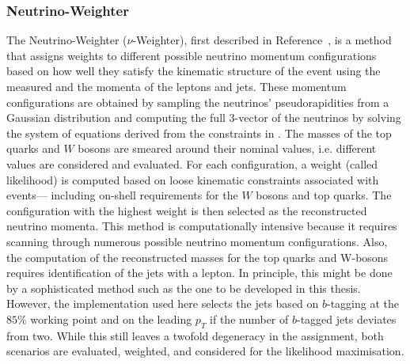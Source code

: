 \subsubsection{Neutrino-Weighter}
\label{sec:nu_weighter}
The Neutrino-Weighter ($\nu$-Weighter), first described in Reference~\cite{neutrino_weighting_method}, is a method that assigns weights to different possible neutrino momentum configurations based on how well they satisfy the kinematic structure of the event using the measured \met and the momenta of the leptons and jets. These momentum configurations are obtained by sampling the neutrinos' pseudorapidities from a Gaussian distribution and computing the full 3-vector of the neutrinos by solving the system of equations derived from the constraints in . The masses of the top quarks and $W$ bosons are smeared around their nominal values, i.e. different values are considered and evaluated.
For each configuration, a weight (called likelihood) is computed based on loose kinematic constraints associated with \ttbar events— including on-shell requirements for the $W$ bosons and top quarks. The configuration with the highest weight is then selected as the reconstructed neutrino momenta. This method is computationally intensive because it requires scanning through numerous possible neutrino momentum configurations. Also, the computation of the reconstructed masses for the top quarks and W-bosons requires identification of the jets with a lepton. In principle, this might be done by a sophisticated method such as the one to be developed in this thesis. However, the implementation used here selects the jets based on $b$-tagging at the $ 85\%$ working point and on the leading $p_T$ if the number of $b$-tagged jets deviates from two. While this still leaves a twofold degeneracy in the assignment, both scenarios are evaluated, weighted, and considered for the likelihood maximisation.


